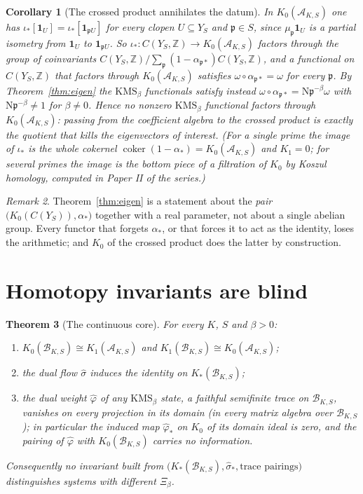 \documentclass[11pt]{amsart}
\numberwithin{equation}{section}
\newtheorem{theorem}{Theorem}[section]
\newtheorem{corollary}[theorem]{Corollary}
\theoremstyle{definition}
\theoremstyle{remark}
\newtheorem{remark}[theorem]{Remark}
\newcommand{\Z}{\mathbb{Z}}
\newcommand{\cA}{\mathcal{A}}
\newcommand{\cB}{\mathcal{B}}
\newcommand{\pp}{\mathfrak{p}}
\newcommand{\Ns}{\mathrm{N}}
\newcommand{\coker}{\operatorname{coker}}
\begin{document}
\begin{corollary}[The crossed product annihilates the datum]\label{cor:annih}
In $K_0(\cA_{K,S})$ one has $\iota_*[\mathbf 1_U]=\iota_*[\mathbf 1_{\pp U}]$ for every
clopen $U\subseteq Y_S$ and $\pp\in S$, since $\mu_\pp\mathbf 1_U$ is a partial isometry from
$\mathbf 1_U$ to $\mathbf 1_{\pp U}$. So $\iota_*:C(Y_S,\Z)\to K_0(\cA_{K,S})$ factors
through the group of coinvariants $C(Y_S,\Z)/\sum_\pp(1-\alpha_{\pp*})C(Y_S,\Z)$, and a
functional on $C(Y_S,\Z)$ that factors through $K_0(\cA_{K,S})$ satisfies
$\omega\circ\alpha_{\pp*}=\omega$ for every $\pp$. By Theorem~\ref{thm:eigen} the
$\mathrm{KMS}_\beta$ functionals satisfy instead $\omega\circ\alpha_{\pp*}=\Ns\pp^{-\beta}\omega$
with $\Ns\pp^{-\beta}\ne1$ for $\beta\ne0$. Hence no nonzero $\mathrm{KMS}_\beta$ functional
factors through $K_0(\cA_{K,S})$: passing from the coefficient algebra to the crossed
product is exactly the quotient that kills the eigenvectors of interest. (For a single
prime the image of $\iota_*$ is the whole cokernel $\coker(1-\alpha_*)=K_0(\cA_{K,S})$ and
$K_1=0$; for several primes the image is the bottom piece of a filtration of $K_0$ by Koszul
homology, computed in Paper II of the series.)
\end{corollary}

\begin{remark}\label{rem:pair}
Theorem~\ref{thm:eigen} is a statement about the \emph{pair} $\bigl(K_0(C(Y_S)),\alpha_*\bigr)$
together with a real parameter, not about a single abelian group. Every functor that forgets
$\alpha_*$, or that forces it to act as the identity, loses the arithmetic; and
$K_0$ of the crossed product does the latter by construction.
\end{remark}

\section{Homotopy invariants are blind}\label{sec:homotopy}

\begin{theorem}[The continuous core]\label{thm:core}
For every $K$, $S$ and $\beta>0$:
\begin{enumerate}
\item $K_0(\cB_{K,S})\cong K_1(\cA_{K,S})$ and $K_1(\cB_{K,S})\cong K_0(\cA_{K,S})$;
\item the dual flow $\hat\sigma$ induces the identity on $K_*(\cB_{K,S})$;
\item the dual weight $\hat\varphi$ of any $\mathrm{KMS}_\beta$ state, a faithful
semifinite trace on $\cB_{K,S}$, vanishes on every projection in its domain (in every
matrix algebra over $\cB_{K,S}$); in particular the induced map $\hat\varphi_*$ on $K_0$ of
its domain ideal is zero, and the pairing of $\hat\varphi$ with $K_0(\cB_{K,S})$ carries no
information.
\end{enumerate}
Consequently no invariant built from $\bigl(K_*(\cB_{K,S}),\hat\sigma_*,\text{trace pairings}\bigr)$
distinguishes systems with different $\Xi_\beta$.
\end{theorem}
\end{document}

